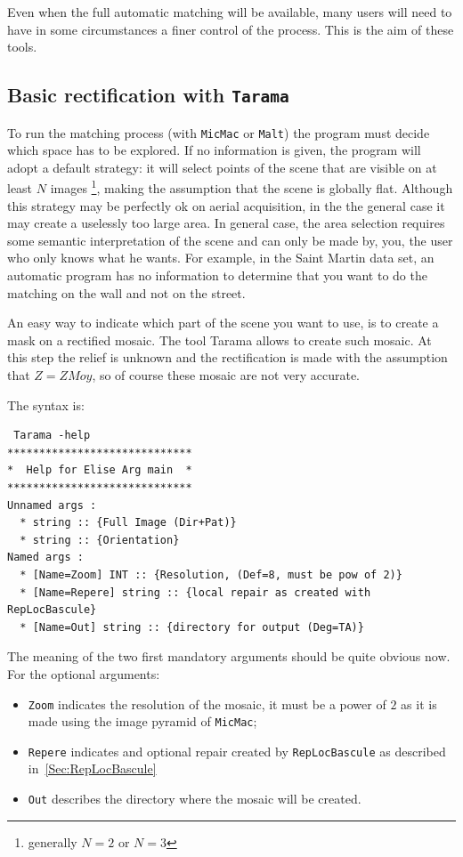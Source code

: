 \label{SemiAutoMatch}

Even when the full automatic matching will be available, many users will need to have
in some circumstances a finer control of the process. This is the aim of these tools.

\subsection{Basic rectification with {\tt Tarama}}

\label{Sec:Tarama}

To run the matching process (with {\tt MicMac} or {\tt Malt}) the
program must decide which space has to be explored. If no
information is given, the program will adopt a default strategy: it
will select points of the scene that are visible on at least $N$ images
\footnote{generally $N=2$ or $N=3$},
making the assumption that the scene is globally flat. Although this
strategy may be perfectly ok on aerial acquisition, in the the general
case it may create a uselessly too large area. In general case, the
area selection requires some semantic interpretation of the scene
and can only be made by, you, the user who only knows what he wants.
For example, in the Saint Martin data set, an automatic program has no
information to determine that you want to do the matching on the wall
and not on the street.

An easy way to indicate which part of the scene you want to use,
is to create a mask on a rectified mosaic. The tool Tarama allows
to create such mosaic. At this step the relief is unknown and the
rectification is made with the assumption that $Z=ZMoy$, so of
course these mosaic are not very accurate.

The syntax is:

\begin{verbatim}
 Tarama -help
*****************************
*  Help for Elise Arg main  *
*****************************
Unnamed args :
  * string :: {Full Image (Dir+Pat)}
  * string :: {Orientation}
Named args :
  * [Name=Zoom] INT :: {Resolution, (Def=8, must be pow of 2)}
  * [Name=Repere] string :: {local repair as created with RepLocBascule}
  * [Name=Out] string :: {directory for output (Deg=TA)}
\end{verbatim}

The meaning of the two first mandatory arguments should be quite obvious now.
For the optional arguments:

\begin{itemize}
   \item  {\tt Zoom} indicates the resolution of the mosaic, it must be a power
	  of $2$ as it is made using the image pyramid of {\tt MicMac};

   \item  {\tt Repere} indicates and optional repair created by {\tt RepLocBascule}
	  as described in~\ref{Sec:RepLocBascule}
   \item {\tt Out} describes the directory where the mosaic will be created.
\end{itemize}

